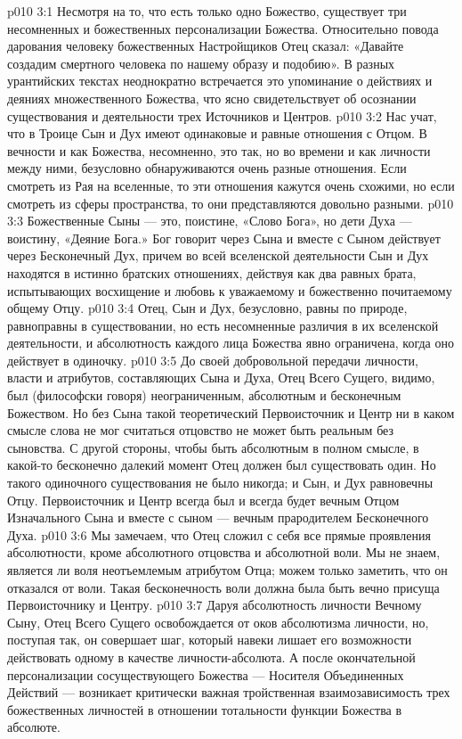 \vs p010 3:1 Несмотря на то, что есть только одно Божество, существует три несомненных и божественных персонализации Божества. Относительно повода дарования человеку божественных Настройщиков Отец сказал: «Давайте создадим смертного человека по нашему образу и подобию». В разных урантийских текстах неоднократно встречается это упоминание о действиях и деяниях множественного Божества, что ясно свидетельствует об осознании существования и деятельности трех Источников и Центров.
\vs p010 3:2 \pc Нас учат, что в Троице Сын и Дух имеют одинаковые и равные отношения с Отцом. В вечности и как Божества, несомненно, это так, но во времени и как личности между ними, безусловно обнаруживаются очень разные отношения. Если смотреть из Рая на вселенные, то эти отношения кажутся очень схожими, но если смотреть из сферы пространства, то они представляются довольно разными.
\vs p010 3:3 Божественные Сыны --- это, поистине, «Слово Бога», но дети Духа --- воистину, «Деяние Бога.» Бог говорит через Сына и вместе с Сыном действует через Бесконечный Дух, причем во всей вселенской деятельности Сын и Дух находятся в истинно братских отношениях, действуя как два равных брата, испытывающих восхищение и любовь к уважаемому и божественно почитаемому общему Отцу.
\vs p010 3:4 Отец, Сын и Дух, безусловно, равны по природе, равноправны в существовании, но есть несомненные различия в их вселенской деятельности, и абсолютность каждого лица Божества явно ограничена, когда оно действует в одиночку.
\vs p010 3:5 \pc До своей добровольной передачи личности, власти и атрибутов, составляющих Сына и Духа, Отец Всего Сущего, видимо, был (философски говоря) неограниченным, абсолютным и бесконечным Божеством. Но без Сына такой теоретический Первоисточник и Центр ни в каком смысле слова не мог считаться  отцовство не может быть реальным без сыновства. С другой стороны, чтобы быть абсолютным в полном смысле, в какой\hyp{}то бесконечно далекий момент Отец должен был существовать один. Но такого одиночного существования не было никогда; и Сын, и Дух равновечны Отцу. Первоисточник и Центр всегда был и всегда будет вечным Отцом Изначального Сына и вместе с сыном --- вечным прародителем Бесконечного Духа.
\vs p010 3:6 Мы замечаем, что Отец сложил с себя все прямые проявления абсолютности, кроме абсолютного отцовства и абсолютной воли. Мы не знаем, является ли воля неотъемлемым атрибутом Отца; можем только заметить, что он  отказался от воли. Такая бесконечность воли должна была быть вечно присуща Первоисточнику и Центру.
\vs p010 3:7 Даруя абсолютность личности Вечному Сыну, Отец Всего Сущего освобождается от оков абсолютизма личности, но, поступая так, он совершает шаг, который навеки лишает его возможности действовать одному в качестве личности\hyp{}абсолюта. А после окончательной персонализации сосуществующего Божества --- Носителя Объединенных Действий --- возникает критически важная тройственная взаимозависимость трех божественных личностей в отношении тотальности функции Божества в абсолюте.
